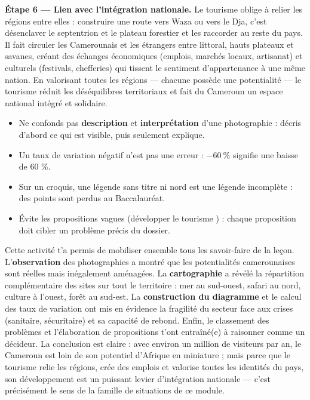 \documentclass[11pt]{article}
\newcommand{\cle}[1]{{\popxbold\color{popdark}#1}}
\newcounter{popsec}
\newcounter{popsub}
\newcommand{\courssub}[1]{%
  \stepcounter{popsub}%
  \par\vspace{9pt}\noindent{\popxbold\fontsize{11.5}{13}\selectfont\color{popink}{\color{poporange}\thepopsec.\thepopsub}\hspace{6pt}#1}\par\nopagebreak\vspace{4pt}
}
\begin{document}
\begin{exoresolu}
\textbf{Étape 6 — Lien avec l'intégration nationale.} Le tourisme oblige à relier les régions entre elles : construire une route vers Waza ou vers le Dja, c'est désenclaver le septentrion et le plateau forestier et les raccorder au reste du pays. Il fait circuler les Camerounais et les étrangers entre littoral, hauts plateaux et savanes, créant des échanges économiques (emplois, marchés locaux, artisanat) et culturels (festivals, chefferies) qui tissent le sentiment d'appartenance à une même nation. En valorisant toutes les régions — chacune possède une potentialité — le tourisme réduit les déséquilibres territoriaux et fait du Cameroun un espace national intégré et solidaire.
\end{exoresolu}

\begin{attention}
\begin{itemize}
\item Ne confonds pas \textbf{description} et \textbf{interprétation} d'une photographie : décris d'abord ce qui est visible, puis seulement explique.
\item Un taux de variation négatif n'est pas une erreur : $-60\ \%$ signifie une baisse de 60 \%.
\item Sur un croquis, une légende sans titre ni nord est une légende incomplète : des points sont perdus au Baccalauréat.
\item Évite les propositions vagues (\og développer le tourisme \fg{}) : chaque proposition doit cibler un problème précis du dossier.
\end{itemize}
\end{attention}

\courssub{Bilan de l'activité}

Cette activité t'a permis de mobiliser ensemble tous les savoir-faire de la leçon. L'\textbf{observation} des photographies a montré que les potentialités camerounaises sont réelles mais inégalement aménagées. La \textbf{cartographie} a révélé la répartition complémentaire des sites sur tout le territoire : mer au sud-ouest, safari au nord, culture à l'ouest, forêt au sud-est. La \textbf{construction du diagramme} et le calcul des taux de variation ont mis en évidence la fragilité du secteur face aux crises (sanitaire, sécuritaire) et sa capacité de rebond. Enfin, le classement des problèmes et l'élaboration de propositions t'ont entraîné(e) à raisonner comme un décideur. La conclusion est claire : avec environ un million de visiteurs par an, le Cameroun est loin de son potentiel d'\og Afrique en miniature \fg{} ; mais parce que le tourisme relie les régions, crée des emplois et valorise toutes les identités du pays, son développement est un puissant levier d'\cle{intégration nationale} — c'est précisément le sens de la famille de situations de ce module.
\end{document}
